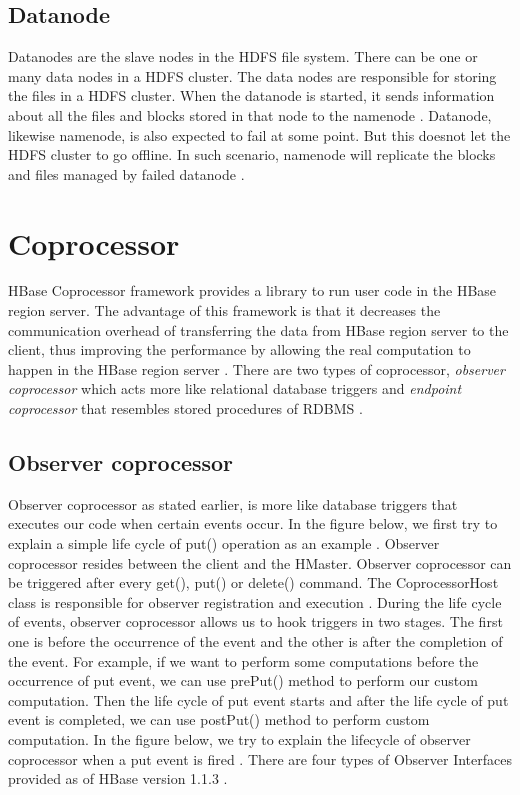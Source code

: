 \documentclass[11pt,a4paper,bibtotoc,idxtotoc,headsepline,footsepline,footexclude,BCOR12mm,DIV13]{scrbook}
\begin{document}
\subsection{Datanode}
\label{DataNode}
Datanodes are the slave nodes in the HDFS file system. There can be one or many data nodes in a HDFS cluster. The data nodes are responsible for storing the files in a HDFS cluster. When the datanode is started, it sends information about all the files and blocks stored in that node to the namenode \cite{HDFS:datanode}. Datanode, likewise namenode, is also expected to fail at some point. But this doesnot let the HDFS cluster to go offline. In such scenario, namenode will replicate the blocks and files managed by failed datanode \cite{HDFS:namenodeanddatanode}. 


\section{Coprocessor}
\label{sec:coprocessor}

HBase Coprocessor framework provides a library to run user code in the HBase region server. The advantage of this framework is that it decreases the communication overhead of transferring the data from HBase region server to the client, thus improving the performance by allowing the real computation to happen in the HBase region server \cite{coprocessor:coprocessor}. There are two types of coprocessor, \emph{observer coprocessor}  which acts more like relational database triggers and \emph{endpoint coprocessor} that resembles stored procedures of RDBMS \cite{coprocessor:types}. 


\subsection{Observer coprocessor}
\label{sec:observercoprocessor}
Observer coprocessor as stated earlier, is more like database triggers that executes our code when certain events occur. In the figure below, we first try to explain a simple life cycle of put() operation as an example \cite{coprocessor:detail}. Observer coprocessor resides between the client and the HMaster. Observer coprocessor can be triggered after every get(), put() or delete() command. The CoprocessorHost class is responsible for observer registration and execution \cite{coprocessor:detail}.  During the life cycle of events, observer coprocessor allows us to hook triggers in two stages. The first one is before the occurrence of the event and the other is after the completion of the event. For example, if we want to perform some computations before the occurrence of put event, we can use prePut() method to perform our custom computation. Then the life cycle of put event starts and after the life cycle of put event is completed, we can use postPut() method to perform custom computation. In the figure below, we try to explain the lifecycle of observer coprocessor when a put event is fired \cite{coprocessor:detail}.
\newline
There are four types of Observer Interfaces provided as of HBase version 1.1.3 \cite{hbase:essential}.
\end{document}
